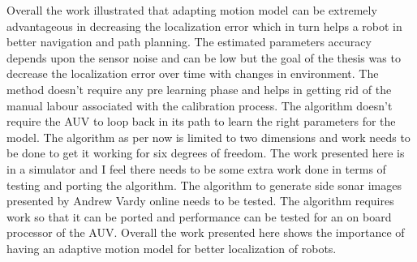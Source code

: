 \documentclass[12pt]{dalcsthesis}
\begin{document}
Overall the work illustrated that adapting motion model can be extremely advantageous in decreasing the localization error which in turn helps a robot in better navigation and path planning. The estimated parameters accuracy depends upon the sensor noise and can be low but the goal of the thesis was to decrease the localization error over time with changes in environment. The method doesn't require any pre learning phase and helps in getting rid of the manual labour associated with the calibration process. The algorithm doesn't require the AUV to loop back in its path to learn the right parameters for the model. The algorithm as per now is limited to two dimensions and work needs to be done to get it working for six degrees of freedom. The work presented here is in a simulator and I feel there needs to be some extra work done in terms of testing and porting the algorithm. The algorithm to generate side sonar images presented by Andrew Vardy \cite{vandrish2011side} online needs to be tested. The algorithm requires work so that it can be ported and performance can be tested for an on board processor of the AUV. Overall the work presented here shows the importance of having an adaptive motion model for better localization of robots.   




\end{document}
